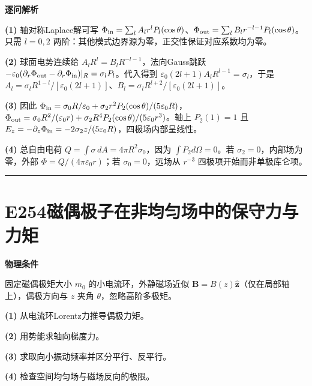 \documentclass[UTF8,a4paper,11pt,oneside,openany]{ctexbook}
\begin{document}
\par\medskip\noindent\textbf{逐问解析}
\par\noindent\textbf{(1)} 轴对称Laplace解可写 \(\Phi_{\rm in}=\sum_l A_lr^lP_l(\cos\theta)\)、\(\Phi_{\rm out}=\sum_l B_lr^{-l-1}P_l(\cos\theta)\)。只需 \(l=0,2\) 两阶：其他模式边界源为零，正交性保证对应系数均为零。
\par\noindent\textbf{(2)} 球面电势连续给 \(A_lR^l=B_lR^{-l-1}\)，法向Gauss跳跃 \(-\varepsilon_0(\partial_r\Phi_{\rm out}-\partial_r\Phi_{\rm in})|_R=\sigma_lP_l\)。代入得到 \(\varepsilon_0(2l+1)A_lR^{l-1}=\sigma_l\)，于是 \(A_l=\sigma_lR^{1-l}/[\varepsilon_0(2l+1)]\)、\(B_l=\sigma_lR^{l+2}/[\varepsilon_0(2l+1)]\)。
\par\noindent\textbf{(3)} 因此 \(\Phi_{\rm in}=\sigma_0R/\varepsilon_0+\sigma_2r^2P_2(\cos\theta)/(5\varepsilon_0R)\)，\(\Phi_{\rm out}=\sigma_0R^2/(\varepsilon_0r)+\sigma_2R^4P_2(\cos\theta)/(5\varepsilon_0r^3)\)。轴上 \(P_2(1)=1\) 且 \(E_z=-\partial_z\Phi_{\rm in}=-2\sigma_2z/(5\varepsilon_0R)\)，四极场内部呈线性。
\par\noindent\textbf{(4)} 总自由电荷 \(Q=\int\sigma\,dA=4\pi R^2\sigma_0\)，因为 \(\int P_2d\Omega=0\)。若 \(\sigma_2=0\)，内部场为零，外部 \(\Phi=Q/(4\pi\varepsilon_0r)\)；若 \(\sigma_0=0\)，远场从 \(r^{-3}\) 四极项开始而非单极库仑项。

\par\bigskip\hrule\bigskip
\section*{E254\quad 磁偶极子在非均匀场中的保守力与力矩}
\textbf{物理条件}\par 固定磁偶极矩大小 \(m_0\) 的小电流环，外静磁场近似 \(\boldsymbol B=B(z)\hat{\boldsymbol z}\)（仅在局部轴上），偶极方向与 \(z\) 夹角 \(\theta\)，忽略高阶多极矩。
\par\noindent\textbf{(1)} 从电流环Lorentz力推导偶极力矩。
\par\noindent\textbf{(2)} 用势能求轴向梯度力。
\par\noindent\textbf{(3)} 求取向小振动频率并区分平行、反平行。
\par\noindent\textbf{(4)} 检查空间均匀场与磁场反向的极限。
\end{document}

